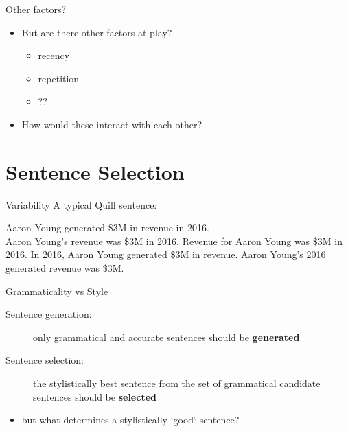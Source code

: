 \documentclass[10pt, compress]{beamer}		%
\begin{document}
\begin{frame}{Other factors?}
	\begin{itemize}
		\item But are there other factors at play? \pause
		\begin{itemize}
			\item recency
			\item repetition
			\item ?? \pause
		\end{itemize}
		\item How would these interact with each other?
	\end{itemize}
\end{frame}


\section{Sentence Selection}
\begin{frame}{Variability}
    A typical Quill sentence:
    \begin{exe}
        \ex \begin{xlist}
            \ex Aaron Young generated \$3M in revenue in 2016. \\ \pause
            \ex Aaron Young's revenue was \$3M in 2016.
            \ex Revenue for Aaron Young was \$3M in 2016.
            \ex In 2016, Aaron Young generated \$3M in revenue.
            \ex Aaron Young's 2016 generated revenue was \$3M.
        \end{xlist}
    \end{exe}
\end{frame}

\begin{frame}{Grammaticality vs Style}
    \begin{description}
        \item[Sentence generation:] only grammatical and accurate sentences should be {\bf generated}
        \item[Sentence selection:] the stylistically best sentence from the set of grammatical candidate sentences should be {\bf selected} \pause
    \end{description}

    \begin{itemize}
        \item but what determines a stylistically `good` sentence?
    \end{itemize}
\end{frame}
\end{document}
